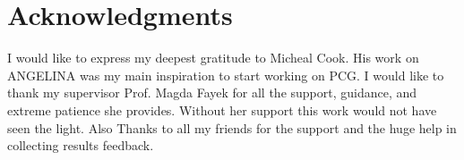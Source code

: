 \documentclass[letterpaper]{article}
\begin{document}
\section{Acknowledgments}
I would like to express my deepest gratitude to Micheal Cook. His work on ANGELINA was my main inspiration to start working on PCG. I would like to thank my supervisor Prof. Magda Fayek for all the support, guidance, and extreme patience she provides. Without her support this work would not have seen the light. Also Thanks to all my friends for the support and the huge help in collecting results feedback.



\end{document}

